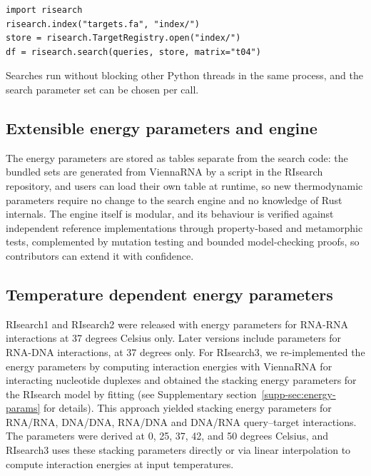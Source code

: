 \documentclass[unnumsec,webpdf,contemporary,large]{oup-authoring-template}
\begin{document}
\begin{verbatim}
import risearch
risearch.index("targets.fa", "index/")
store = risearch.TargetRegistry.open("index/")
df = risearch.search(queries, store, matrix="t04")
\end{verbatim}

Searches run without blocking other Python threads in the same process, and the search parameter set can be chosen per call.

\subsection*{Extensible energy parameters and engine}

The energy parameters are stored as tables separate from the search code: the bundled sets are generated from ViennaRNA by a script in the RIsearch repository, and users can load their own table at runtime, so new thermodynamic parameters require no change to the search engine and no knowledge of Rust internals.
The engine itself is modular, and its behaviour is verified against independent reference implementations through property-based and metamorphic tests, complemented by mutation testing and bounded model-checking proofs, so contributors can extend it with confidence.

\subsection*{Temperature dependent energy parameters}
RIsearch1 and RIsearch2 were released with energy parameters for RNA-RNA interactions at 37 degrees Celsius only. Later versions \cite{corsi2022crispr} include parameters for RNA-DNA interactions, at 37 degrees only. For RIsearch3, we re-implemented the energy parameters by computing interaction energies with ViennaRNA for interacting nucleotide duplexes and obtained the stacking energy parameters for the RIsearch model by fitting (see Supplementary section~\ref*{supp-sec:energy-params} for details). This approach yielded stacking energy parameters for RNA/RNA, DNA/DNA, RNA/DNA and DNA/RNA query--target interactions. The parameters were derived at 0, 25, 37, 42, and 50 degrees Celsius, and RIsearch3 uses these stacking parameters directly or via linear interpolation to compute interaction energies at input temperatures.
\end{document}
